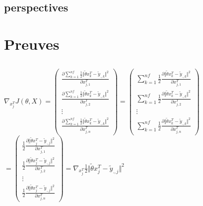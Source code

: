 \documentclass[a4paper,10pt]{article}
\begin{document}
\subsection{perspectives}
\appendix
\section{Preuves}
\subsection{}
\label{P1}
$\nabla_{x_{j}^T} J(\theta, X)=
\begin{pmatrix}
\displaystyle\frac{\partial \displaystyle\sum_{k=1}^{nf}\frac{1}{2}\Vert\tilde{\theta}x_{k}^{T}-\tilde{y}_{.,k}\Vert^{2}}{\partial x_{j,1}^{T}}\\
\displaystyle\frac{\partial \displaystyle\sum_{k=1}^{nf}\frac{1}{2}\Vert\tilde{\theta}x_{k}^{T}-\tilde{y}_{.,k}\Vert^{2}}{\partial x_{j,2}^{T}}\\
\vdots\\
\displaystyle\frac{\partial \displaystyle\sum_{k=1}^{nf}\frac{1}{2}\Vert\tilde{\theta}x_{k}^{T}-\tilde{y}_{.,k}\Vert^{2}}{\partial x_{j,n}^{T}}
\end{pmatrix}
=
\begin{pmatrix}
\displaystyle\sum_{k=1}^{nf}
\frac{1}{2}\frac{\partial\Vert\tilde{\theta}x_{k}^{T}-\tilde{y}_{.,k}\Vert^{2}}{\partial x_{j,1}^{T}}\\
\displaystyle\sum_{k=1}^{nf}
\frac{1}{2}\frac{\partial\Vert\tilde{\theta}x_{k}^{T}-\tilde{y}_{.,k}\Vert^{2}}{\partial x_{j,2}^{T}}\\
\vdots\\
\displaystyle\sum_{k=1}^{nf}
\frac{1}{2}\frac{\partial\Vert\tilde{\theta}x_{k}^{T}-\tilde{y}_{.,k}\Vert^{2}}{\partial x_{j,n}^{T}}
\end{pmatrix}$\\
$
=
\begin{pmatrix}
\displaystyle
\frac{1}{2}\frac{\partial\Vert\tilde{\theta}x_{j}^{T}-\tilde{y}_{.,j}\Vert^{2}}{\partial x_{j,1}^{T}}\\
\displaystyle
\frac{1}{2}\frac{\partial\Vert\tilde{\theta}x_{j}^{T}-\tilde{y}_{.,j}\Vert^{2}}{\partial x_{j,2}^{T}}\\
\vdots\\
\displaystyle
\frac{1}{2}\frac{\partial\Vert\tilde{\theta}x_{j}^{T}-\tilde{y}_{.,j}\Vert^{2}}{\partial x_{j,n}^{T}}
\end{pmatrix}
=
\displaystyle
\nabla_{x_{j}^T}\frac{1}{2}\Vert\tilde{\theta}x_{j}^{T}-\tilde{y}_{.,j}\Vert^{2}
$
\end{document}
